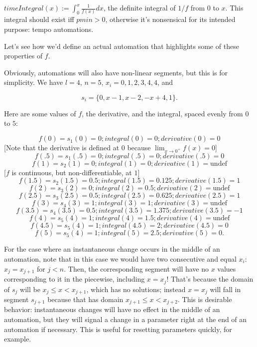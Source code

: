 \documentclass{article}
\begin{document}
$timeIntegral(x) := \int_{0}^{x} \frac{1}{f(x)} dx$, the definite integral of $1/f$ from $0$ to $x$. This integral should exist iff $pmin>0$, otherwise it's nonsensical for its intended purpose: tempo automations.

Let's see how we'd define an actual automation that highlights some of these properties of $f$.



Obviously, automations will also have non-linear segments, but this is for simplicity. We have $l=4$, $n=5$, $x_i={0, 1, 2, 3, 4, 4}$, and

$$s_i = \{0, x-1, x-2, -x+4, 1\}.$$

Here are some values of $f$, the derivative, and the integral, spaced evenly from $0$ to $5$:

$$f(0) = s_1(0) = 0; integral(0) = 0; derivative(0) = 0$$ [Note that the derivative is defined at $0$ because $\lim_{x\to 0^+} f(x) = 0$]
$$f(.5) = s_1(.5) = 0; integral(.5) = 0; derivative(.5) = 0$$
$$f(1) = s_2(1) = 0; integral(1) = 0; derivative(1) = \text{undef}$$ [$f$ is continuous, but non-differentiable, at $1$]
$$f(1.5) = s_2(1.5) = 0.5; integral(1.5) = 0.125; derivative(1.5) = 1$$
$$f(2) = s_3(2) = 0; integral(2) = 0.5; derivative(2) = \text{undef}$$
$$f(2.5) = s_3(2.5) = 0.5; integral(2.5) = 0.625; derivative(2.5) = 1$$
$$f(3) = s_4(3) = 1; integral(3) = 1; derivative(3) = \text{undef}$$
$$f(3.5) = s_4(3.5) = 0.5; integral(3.5) = 1.375; derivative(3.5) = -1$$
$$f(4) = s_5(4) = 1; integral(4) = 1.5; derivative(4) = \text{undef}$$
$$f(4.5) = s_5(4) = 1; integral(4.5) = 2; derivative(4.5) = 0$$
$$f(5) = s_5(4) = 1; integral(5) = 2.5; derivative(5) = 0.$$

For the case where an instantaneous change occurs in the middle of an automation, note that in this case we would have two consecutive and equal $x_i$: $x_j = x_{j+1}$ for $j<n$. Then, the corresponding segment will have no $x$ values corresponding to it in the piecewise, including $x=x_j$! That's because the domain of $s_j$ will be $x_j \leq x < x_{j+1}$, which has no solutions; instead $x=x_j$ will fall in segment $s_{j+1}$ because that has domain $x_{j+1} \leq x < x_{j+2}$. This is desirable behavior: instantaneous changes will have no effect in the middle of an automation, but they will signal a change in a parameter right at the end of an automation if necessary. This is useful for resetting parameters quickly, for example.
\end{document}
